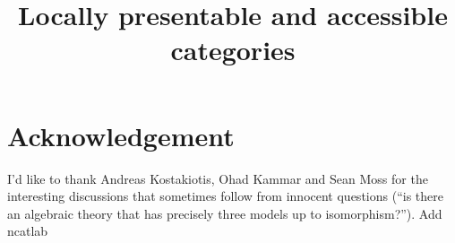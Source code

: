 \documentclass[11pt,a4paper]{article}
\title{Locally presentable and accessible categories}
\theoremstyle{margin}
\theoremstyle{nonumberplain}
\begin{document}
\maketitle

\pagebreak
\tableofcontents
\pagebreak


\parindent0cm


 \pagebreak
 \pagebreak
 \pagebreak
 \pagebreak
 \pagebreak
 \pagebreak

\section*{Acknowledgement}
I'd like to thank Andreas Kostakiotis, Ohad Kammar and Sean Moss for the interesting discussions that sometimes follow from innocent questions (``is there an algebraic theory that has precisely three models up to isomorphism?'').
Add ncatlab


\nocite{*}


\printbibliography[title=Bibliography]
\end{document}

